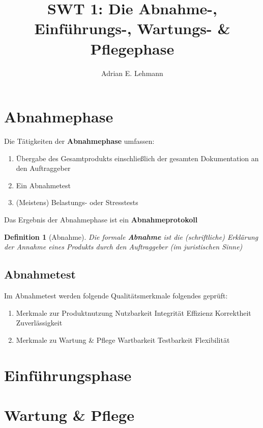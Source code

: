 \documentclass[a4paper]{article}
\title{SWT 1: Die Abnahme-, Einführungs-, Wartungs- \& Pflegephase}
\author{Adrian E. Lehmann}
\theoremstyle{break}
\newtheorem{defi}{Definition}[section]
\begin{document}
	\maketitle
	\tableofcontents
	\newpage

\section{Abnahmephase}
Die Tätigkeiten der \textbf{Abnahmephase} umfassen:
\begin{enumerate}
	\item Übergabe des Gesamtprodukts einschließlich der gesamten Dokumentation an den Auftraggeber
	\item Ein Abnahmetest
	\item (Meistens) Belastungs- oder Stresstests
\end{enumerate}
Das Ergebnis der Abnahmephase ist ein \textbf{Abnahmeprotokoll}
\begin{defi}[Abnahme]
	Die formale \textbf{Abnahme} ist die (schriftliche) Erklärung der Annahme eines Produkts durch den Auftraggeber (im juristischen Sinne)
\end{defi}
	
\subsection{Abnahmetest}
Im Abnahmetest werden folgende Qualitätsmerkmale folgendes geprüft:\newline
\begin{enumerate}
	\item Merkmale zur Produktnutzung
		\subitem Nutzbarkeit
		\subitem Integrität
		\subitem Effizienz
		\subitem Korrektheit 
		\subitem Zuverlässigkeit
	\item Merkmale zu Wartung \& Pflege
		\subitem Wartbarkeit
		\subitem Testbarkeit
		\subitem Flexibilität
\end{enumerate}
\section{Einführungsphase}

\section{Wartung \& Pflege}
\end{document}
